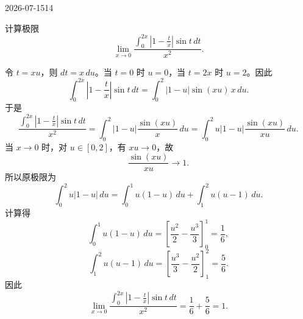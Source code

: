 \begin{mistake}{2026-07-15}{14}

\begin{problemcontent}
计算极限
\[
\lim_{x\to 0}\frac{\displaystyle\int_0^{2x}\left|1-\frac{t}{x}\right|\sin t\,dt}{x^2}.
\]
\end{problemcontent}

\begin{solutioncontent}
令 \(t=xu\)，则 \(dt=x\,du\)。当 \(t=0\) 时 \(u=0\)，当 \(t=2x\) 时 \(u=2\)。因此
\[
\int_0^{2x}\left|1-\frac{t}{x}\right|\sin t\,dt
=\int_0^2 |1-u|\sin(xu)\,x\,du.
\]
于是
\[
\frac{\displaystyle\int_0^{2x}\left|1-\frac{t}{x}\right|\sin t\,dt}{x^2}
=\int_0^2 |1-u|\frac{\sin(xu)}{x}\,du
=\int_0^2 u|1-u|\frac{\sin(xu)}{xu}\,du.
\]
当 \(x\to 0\) 时，对 \(u\in[0,2]\)，有 \(xu\to 0\)，故
\[
\frac{\sin(xu)}{xu}\to 1.
\]
所以原极限为
\[
\int_0^2 u|1-u|\,du
=\int_0^1 u(1-u)\,du+\int_1^2 u(u-1)\,du.
\]
计算得
\[
\int_0^1 u(1-u)\,du=\left[\frac{u^2}{2}-\frac{u^3}{3}\right]_0^1=\frac16,
\]
\[
\int_1^2 u(u-1)\,du=\left[\frac{u^3}{3}-\frac{u^2}{2}\right]_1^2=\frac56.
\]
因此
\[
\lim_{x\to 0}\frac{\displaystyle\int_0^{2x}\left|1-\frac{t}{x}\right|\sin t\,dt}{x^2}
=\frac16+\frac56=1.
\]
\end{solutioncontent}


\end{mistake}
